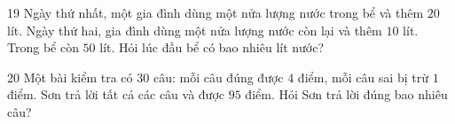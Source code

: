 \begin{probbox}{19}{}
Ngày thứ nhất, một gia đình dùng một nửa lượng nước trong bể và thêm $20$ lít. Ngày thứ hai, gia đình dùng một nửa lượng nước còn lại và thêm $10$ lít. Trong bể còn $50$ lít. Hỏi lúc đầu bể có bao nhiêu lít nước?
\end{probbox}
\gap
\begin{probbox}{20}{}
Một bài kiểm tra có $30$ câu: mỗi câu đúng được $4$ điểm, mỗi câu sai bị trừ $1$ điểm. Sơn trả lời tất cả các câu và được $95$ điểm. Hỏi Sơn trả lời đúng bao nhiêu câu?
\end{probbox}
